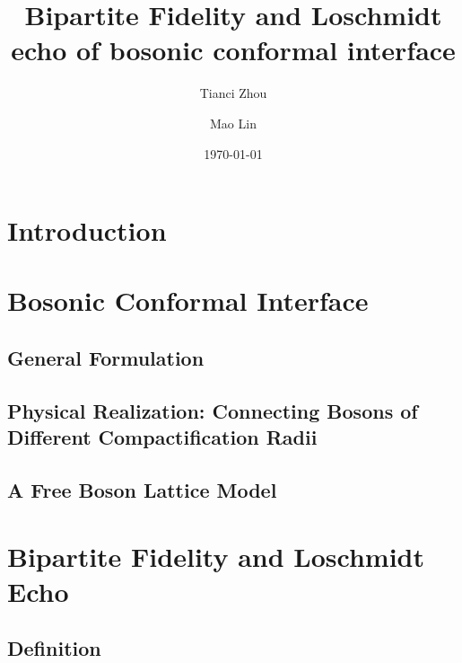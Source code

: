 \documentclass[preprint, prb]{revtex4-1}
\begin{document}
\title{Bipartite Fidelity and Loschmidt echo of bosonic conformal interface}
 
\author{Tianci Zhou}

\author{Mao Lin}

\date{\today}

\begin{abstract}
\end{abstract}

\maketitle

\section{Introduction}

\section{Bosonic Conformal Interface}
\subsection{General Formulation}
\subsection{Physical Realization: Connecting Bosons of Different Compactification Radii}
\subsection{A Free Boson Lattice Model}

\section{Bipartite Fidelity and Loschmidt Echo}
\subsection{Definition}
\end{document}
